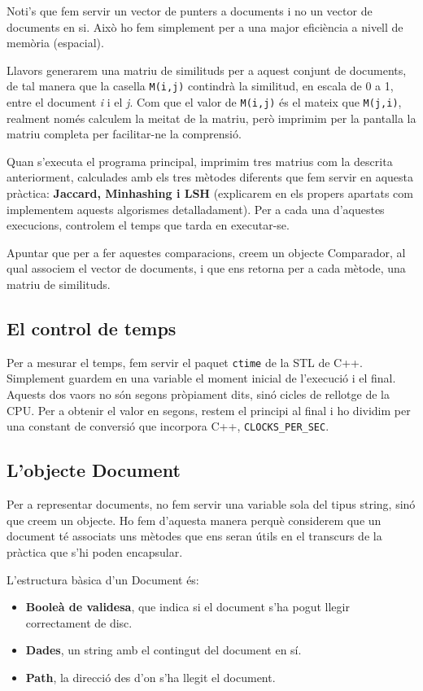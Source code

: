 \documentclass[catalan, 12pt]{report}
\begin{document}
Noti's que fem servir un vector de punters a documents i no un vector de documents en si. Això ho fem simplement per a una major eficiència a nivell de memòria (espacial).

Llavors generarem una matriu de similituds per a aquest conjunt de documents, de tal manera que la casella \verb|M(i,j)| contindrà la similitud, en escala de 0 a 1, entre el document \textit{i} i el \textit{j}. Com que el valor de \verb|M(i,j)| és el mateix que \verb|M(j,i)|, realment només calculem la meitat de la matriu, però imprimim per la pantalla la matriu completa per facilitar-ne la comprensió.

Quan s'executa el programa principal, imprimim tres matrius com la descrita anteriorment, calculades amb els tres mètodes diferents que fem servir en aquesta pràctica: \textbf{Jaccard, Minhashing i LSH} (explicarem en els propers apartats com implementem aquests algorismes detalladament). Per a cada una d'aquestes execucions, controlem el temps que tarda en executar-se.

Apuntar que per a fer aquestes comparacions, creem un objecte Comparador, al qual associem el vector de documents, i que ens retorna per a cada mètode, una matriu de similituds.

\subsection{El control de temps}

Per a mesurar el temps, fem servir el paquet \verb|ctime| de la STL de C++. Simplement guardem en una variable el moment inicial de l'execució i el final. Aquests dos vaors no són segons pròpiament dits, sinó cicles de rellotge de la CPU. Per a obtenir el valor en segons, restem el principi al final i ho dividim per una constant de conversió que incorpora C++, \verb|CLOCKS_PER_SEC|.

\subsection{L'objecte Document}

Per a representar documents, no fem servir una variable sola del tipus string, sinó que creem un objecte. Ho fem d'aquesta manera perquè considerem que un document té associats uns mètodes que ens seran útils en el transcurs de la pràctica que s'hi poden encapsular.

L'estructura bàsica d'un Document és:

\begin{itemize}
\item \textbf{Booleà de validesa}, que indica si el document s'ha pogut llegir correctament de disc.
\item \textbf{Dades}, un string amb el contingut del document en sí.
\item \textbf{Path}, la direcció des d'on s'ha llegit el document.
\end{itemize}
\end{document}
